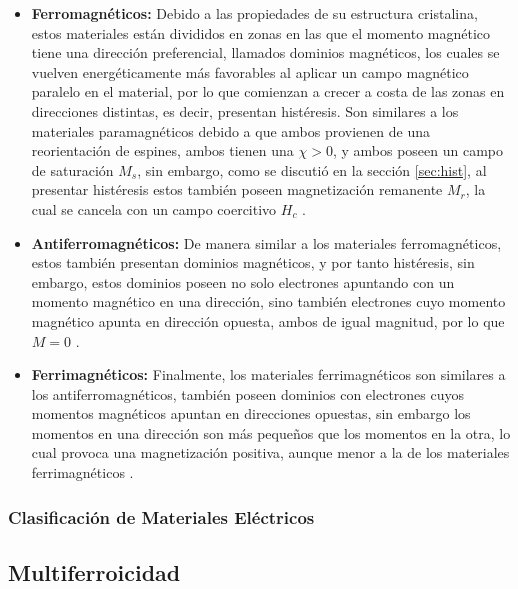 \documentclass[../main.tex]{subfiles}
\begin{document}
\begin{itemize}
    \item \textbf{Ferromagnéticos:} Debido a las propiedades de su estructura cristalina, estos materiales están divididos en zonas en las que el momento magnético tiene una dirección preferencial, llamados dominios magnéticos, los cuales se vuelven energéticamente más favorables al aplicar un campo magnético paralelo en el material, por lo que comienzan a crecer a costa de las zonas en direcciones distintas, es decir, presentan histéresis. Son similares a los materiales paramagnéticos debido a que ambos provienen de una reorientación de espines, ambos tienen una $\chi>0$, y ambos poseen un campo de saturación $M_s$, sin embargo, como se discutió en la sección \ref{sec:hist}, al presentar histéresis estos también poseen magnetización remanente $M_r$, la cual se cancela con un campo coercitivo $H_c$ \cite{coey2010magnetism}.
    \item \textbf{Antiferromagnéticos:} De manera similar a los materiales ferromagnéticos, estos también presentan dominios magnéticos, y por tanto histéresis, sin embargo, estos dominios poseen no solo electrones apuntando con un momento magnético en una dirección, sino también electrones cuyo momento magnético apunta en dirección opuesta, ambos de igual magnitud, por lo que $M=0$ \cite{coey2010magnetism}.
    \item \textbf{Ferrimagnéticos:} Finalmente, los materiales ferrimagnéticos son similares a los antiferromagnéticos, también poseen dominios con electrones cuyos momentos magnéticos apuntan en direcciones opuestas, sin embargo los momentos en una dirección son más pequeños que los momentos en la otra, lo cual provoca una magnetización positiva, aunque menor a la de los materiales ferrimagnéticos \cite{coey2010magnetism}.
\end{itemize}
\subsubsection{Clasificación de Materiales Eléctricos}
\subsection{Multiferroicidad}
\end{document}

